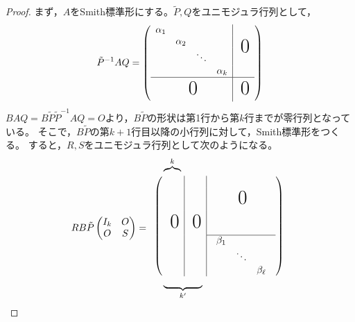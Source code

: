 \documentclass[uplatex]{jsarticle}
\begin{document}
\begin{proof}
  まず，$A$をSmith標準形にする。$\tilde{P},Q$をユニモジュラ行列として，
  \begin{equation}
    \tilde{P}^{-1}AQ = \left( \begin{array}{cccc|c}
      \alpha_{1} &            &        &            & \multirow{4}{*}{\BigZero} \\
                 & \alpha_{2} &        &            & \\
                 &            & \ddots &            & \\
                 &            &        & \alpha_{k} & \\ \hline
      \multicolumn{4}{c|}{\BigZero} & \BigZero
    \end{array} \right)
  \end{equation}
  $BAQ = B\tilde{P} \tilde{P}^{-1} AQ = O$より，$B \tilde{P}$の形状は第1行から第$k$行までが零行列となっている。
  そこで，$B \tilde{P}$の第$k+1$行目以降の小行列に対して，Smith標準形をつくる。
  すると，$R,S$をユニモジュラ行列として次のようになる。
  \begin{equation}
    R B \tilde{P} \begin{pmatrix}
      I_{k} & O \\ O & S
    \end{pmatrix} = 
    \begin{array}{l}
      \hspace{1em}\overbrace{}^{k} \\
      \left( \begin{array}{c|c|c}
                &          & \multirow{4}{*}{\BigZero} \\
                &          &                           \\
                &          &                           \\
        \BigZero & \BigZero &                           \\ \cline{3-3}
                &          & \begin{array}{ccc} \beta_{1} & & \\ & \ddots & \\ & & \beta_{\ell} \end{array} \\
      \end{array} \right) \\
      \hspace{1em}\underbrace{\hspace{4em}}_{k'}
  \end{array}

\end{equation}
\end{proof}
\end{document}
